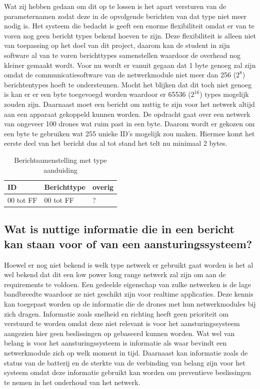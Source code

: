 \documentclass[a4paper, 11pt, oneside]{report}
\begin{document}
Wat zij hebben gedaan om dit op te lossen is het apart versturen van de parameternamen zodat deze in de opvolgende berichten van dat type niet meer nodig is.
Het systeem die bedacht is geeft een enorme flexibiliteit omdat er van te voren nog geen bericht types bekend hoeven te zijn.
Deze flexibiliteit is alleen niet van toepassing op het doel van dit project, daarom kan de student in zijn software al van te voren berichttypes samenstellen waardoor de overhead nog kleiner gemaakt wordt.
Voor nu wordt er vanuit gegaan dat 1 byte genoeg zal zijn omdat de communicatiesoftware van de netwerkmodule niet meer dan 256 ($2^{8}$) berichtentypes hoeft te ondersteunen.
Mocht het blijken dat dit toch niet genoeg is kan er er een byte toegevoegd worden waardoor er 65536 ($2^{16}$) types mogelijk zouden zijn.
Daarnaast moet een bericht om nuttig te zijn voor het netwerk altijd aan een apparaat gekoppeld kunnen worden.
De opdracht gaat over een netwerk van ongeveer 100 drones wat ruim past in een byte.
Daarom wordt er gekozen om een byte te gebruiken wat 255 unieke ID's mogelijk zou maken. 
Hiermee komt het eerste deel van het bericht dus al tot stand het telt nu minimaal 2 bytes.

\begin{table}[H]
	\centering
	\begin{tabular}{|l|l|l|}
		\hline
		\rowcolor[HTML]{C0C0C0} 
		ID & Berichttype & overig \\ \hline
		00 tot FF   & 00 tot FF       & ?      \\ \hline
	\end{tabular}
	\caption{Berichtsamenstelling met type aanduiding}
	\label{tab:serialstart}
\end{table}

\subsection{Wat is nuttige informatie die in een bericht kan staan voor of van een aansturingssysteem?}
\label{sub:watisnuttigeinformatie}
Hoewel er nog niet bekend is welk type netwerk er gebruikt gaat worden is het al wel bekend dat dit een low power long range netwerk zal zijn om aan de requirements te voldoen.
Een gedeelde eigenschap van zulke netwerken is de lage bandbreedte waardoor ze niet geschikt zijn voor realtime applicaties.
Deze kennis kan toegepast worden op de informatie die de drones met hun netwerkmodules bij zich dragen. 
Informatie zoals snelheid en richting heeft geen prioriteit om verstuurd te worden omdat deze niet relevant is voor het aansturingssysteem aangezien hier geen beslissingen op gebaseerd kunnen worden.
Wat wel van belang is voor het aansturingssysteem is informatie als waar bevindt een netwerkmodule zich op welk moment in tijd.
Daarnaast kan informatie zoals de status van de batterij en de sterkte van de verbinding van belang zijn voor het systeem omdat deze informatie gebruikt kan worden om preventieve beslissingen te nemen in het onderhoud van het netwerk.
\end{document}
